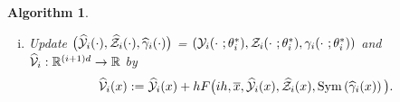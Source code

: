 \documentclass[12pt]{article}
\newtheorem{algo}[prop]{Algorithm}
\numberwithin{equation}{section}
\newcommand{\real}{\mathbb{R}}
\begin{document}
\begin{algo}
\begin{enumerate}[i)]
\begin{enumerate}[a)]
              for any sequence
              $(a_1, \dots, a_{d(d+1)/2}) \in \real^{d(d+1)/2}$ we let %
          \begin{align*}
              {\rm Sym} \big( (a_1, \dots, a_{d(d+1)/2})^\top \big)
                = &
                \begin{pmatrix}
                    2 a_{d(d-1)/2+1}  & a_{d(d+1)/2-1} & \dots        & a_2    & a_1    \\
                    a_{d(d+1)/2-1}    & \ddots  & \ddots     & \ddots & a_3    \\
                    \vdots          & \ddots        & \ddots       & \ddots & \vdots \\
                    a_2          & \ddots        & \ddots       & \ddots & a_{d(d-1)/2} \\
                    a_1               & a_3   & \dots          & a_{d(d-1)/2} & 2 a_{d(d+1)/2}
                \end{pmatrix},
          \end{align*}
	    \item
              choose
              $\theta_i^*$ in the set
              $$\left\{
              \theta = \bigl( W_0, b_0, W_1, b_1, \dots, W_{l-1}, b_{l-1}, W_l, b_l \bigr)
              \ : \
              E_i(\theta) <
                \inf\limits_{\theta} E_i(\theta) + \varepsilon_{\rm thres} \right\}.
	        $$
        \end{enumerate}
      \item Update
	      $\big(\widehat{\cal Y}_i( \cdot ),\widehat{\cal Z}_i( \cdot ),
	      		\widehat{\cal \gamma}_i( \cdot )\big)$
	      = $\left({\cal Y}_i(\cdot \ ;\theta_i^*),{\cal Z}_i(\cdot \ ;\theta_i^*),
	      		{\cal \gamma}_i(\cdot \ ;\theta_i^*)\right)$ and
          $\widehat{\cal V}_i:\real^{(i+1)d} \to \real$ by
          \begin{equation}\label{eq:define_v_hat}
            \widehat{\cal V}_i(x) := \widehat{\cal Y}_i(x) + h F\big( ih,
                \overline{x},
                \widehat{\cal Y}_i(x),
                \widehat{\cal Z}_i(x),
            {\rm Sym} \left( \widehat{\cal \gamma}_i(x) \right)\big).
          \end{equation}
\end{enumerate}
\end{algo}
\end{document}
